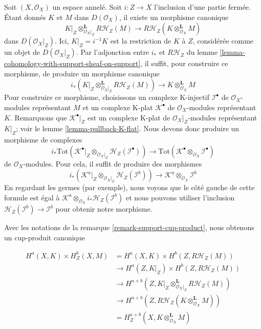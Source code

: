 {\begin{remark}
Soit $(X, \mathcal{O}_X)$ un espace annelé. Soit $i : Z \to X$
l'inclusion d'une partie fermée. Étant donnés $K$ et $M$ dans
$D(\mathcal{O}_X)$, il existe un morphisme canonique
$$
K|_Z \otimes_{\mathcal{O}_X|_Z}^\mathbf{L} R\mathcal{H}_Z(M)
\longrightarrow
R\mathcal{H}_Z(K \otimes_{\mathcal{O}_X}^\mathbf{L} M)
$$
dans $D(\mathcal{O}_X|_Z)$. Ici, $K|_Z = i^{-1}K$ est la restriction de
$K$ à $Z$, considérée comme un objet de $D(\mathcal{O}_X|_Z)$. Par l'adjonction entre $i_*$ et $R\mathcal{H}_Z$ du lemme \ref{lemma-cohomology-with-support-sheaf-on-support}, il suffit, pour construire ce morphisme, de produire un morphisme canonique
$$
i_*\left(K|_Z \otimes_{\mathcal{O}_X|_Z}^\mathbf{L} R\mathcal{H}_Z(M)\right)
\longrightarrow
K \otimes_{\mathcal{O}_X}^\mathbf{L} M
$$
Pour construire ce morphisme, choisissons un complexe K-injectif $\mathcal{I}^\bullet$
de $\mathcal{O}_X$-modules représentant $M$ et un complexe K-plat
$\mathcal{K}^\bullet$ de $\mathcal{O}_X$-modules représentant $K$. Remarquons que $\mathcal{K}^\bullet|_Z$ est un complexe K-plat de
$\mathcal{O}_X|_Z$-modules représentant $K|_Z$; voir le lemme \ref{lemma-pullback-K-flat}. Nous devons donc produire un morphisme de complexes
$$
i_*\text{Tot}\left(
\mathcal{K}^\bullet|_Z \otimes_{\mathcal{O}_X|_Z}
\mathcal{H}_Z(\mathcal{I}^\bullet)\right)
\longrightarrow
\text{Tot}(\mathcal{K}^\bullet \otimes_{\mathcal{O}_X} \mathcal{I}^\bullet)
$$
de $\mathcal{O}_X$-modules. Pour cela, il suffit de produire des morphismes
$$
i_*(\mathcal{K}^a|_Z \otimes_{\mathcal{O}_X|_Z}
\mathcal{H}_Z(\mathcal{I}^b))
\longrightarrow
\mathcal{K}^a \otimes_{\mathcal{O}_X} \mathcal{I}^b
$$
En regardant les germes (par exemple), nous voyons que le côté gauche de cette formule est égal à
$\mathcal{K}^a \otimes_{\mathcal{O}_X} i_*\mathcal{H}_Z(\mathcal{I}^b)$
et nous pouvons utiliser l'inclusion
$\mathcal{H}_Z(\mathcal{I}^b) \to \mathcal{I}^b$ pour obtenir notre morphisme.

\end{remark}

\begin{remark}

\label{remark-support-cup-product-global}

Avec les notations de la remarque \ref{remark-support-cup-product},
nous obtenons un cup-produit canonique

\begin{align*}
H^a(X, K) \times H^b_Z(X, M)
& =
H^a(X, K) \times H^b(Z, R\mathcal{H}_Z(M)) \\
& \to
H^a(Z, K|_Z) \times H^b(Z, R\mathcal{H}_Z(M)) \\
& \to
H^{a + b}(Z, K|_Z \otimes_{\mathcal{O}_X|_Z}^\mathbf{L} R\mathcal{H}_Z(M)) \\
& \to
H^{a + b}(Z, R\mathcal{H}_Z(K \otimes_{\mathcal{O}_X}^\mathbf{L} M)) \\
& =
H^{a + b}_Z(X, K \otimes_{\mathcal{O}_X}^\mathbf{L} M)
\end{align*}


\end{remark}}
